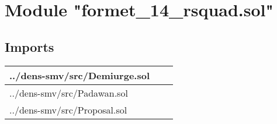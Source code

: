 
\section{Module "formet\_{}14\_{}rsquad.sol"}


\subsection{Imports}


\noindent\begin{tabular}{|l|l|p{5cm}|}\hline
../dens-smv/src/Demiurge.sol &\\\hline
../dens-smv/src/Padawan.sol &\\\hline
../dens-smv/src/Proposal.sol &\\\hline
\end{tabular}

